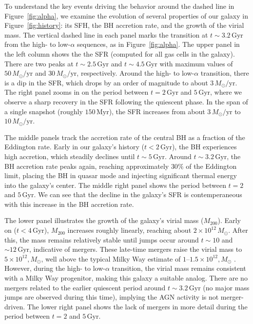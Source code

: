 \documentclass[twocolumn,linenumbers]{aastex631}
\newcommand{\Msun}{\ensuremath{M_{\odot}}}
\newcommand{\Gyr}{\ensuremath{\textrm{Gyr}}}
\newcommand{\Myr}{\ensuremath{\textrm{Myr}}}
\begin{document}
To understand the key events driving the behavior around the dashed line in Figure~\ref{fig:alpha}, we examine the evolution of several properties of our galaxy in Figure~\ref{fig:history}: its SFH, the BH accretion rate, and the growth of the virial mass. The vertical dashed line in each panel marks the transition at $t\sim3.2\,\Gyr$ from the high- to low-$\alpha$ sequences, as in Figure~\ref{fig:alpha}. The upper panel in the left column shows the the SFR (computed for all gas cells in the galaxy). There are two peaks at $t\sim2.5\,\Gyr$ and $t\sim4.5\,\Gyr$ with maximum values of $50\,\Msun/\textrm{yr}$ and $30\,\Msun/\textrm{yr}$, respectively. Around the high- to low-$\alpha$ transition, there is a dip in the SFR, which drops by an order of magnitude to about $3\,\Msun/\textrm{yr}$. The right panel zooms in on the period between $t=2\,\Gyr$ and $5\,\Gyr$, where we observe a sharp recovery in the SFR following the quiescent phase. In the span of a single snapshot (roughly $150\,\Myr$), the SFR increases from about $3\,\Msun/\textrm{yr}$ to $10\,\Msun/\textrm{yr}$.

The middle panels track the accretion rate of the central BH as a fraction of the Eddington rate. Early in our galaxy's history ($t<2\,\Gyr$), the BH experiences high accretion, which steadily declines until $t\sim5\,\Gyr$. Around $t\sim3.2\,\Gyr$, the BH accretion rate peaks again, reaching approximately $30\%$ of the Eddington limit, placing the BH in quasar mode and injecting significant thermal energy into the galaxy's center. The middle right panel shows the period between $t=2$ and $5\,\Gyr$. We can see that the decline in the galaxy's SFR is contemperaneous with this increase in the BH accretion rate.

The lower panel illustrates the growth of the galaxy's virial mass ($M_{200}$). Early on ($t<4\,\Gyr$), $M_{200}$ increases roughly linearly, reaching about $2 \times 10^{12}\,\Msun$. After this, the mass remains relatively stable until jumps occur around $t\sim10$ and $\sim12\,\Gyr$, indicative of mergers. These late-time mergers raise the virial mass to $5 \times 10^{12},\Msun$, well above the typical Milky Way estimate of $1$--$1.5\times 10^{12},\Msun$ \citep[e.g.][]{2016ARA&A..54..529B}. However, during the high- to low-$\alpha$ transition, the virial mass remains consistent with a Milky Way progenitor, making this galaxy a suitable analog. There are no mergers related to the earlier quiescent period around $t\sim3.2\,\Gyr$ (no major mass jumps are observed during this time), implying the AGN activity is not merger-driven. The lower right panel shows the lack of mergers in more detail during the period between $t=2$ and $5\,\Gyr$.
\end{document}
